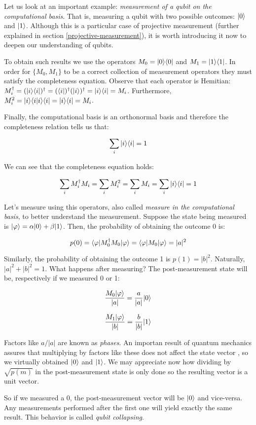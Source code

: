 Let us look at an important example: \emph{measurement of a qubit on the computational basis}. That is, measuring a qubit with two possible outcomes: $|0\rangle$ and $|1\rangle$. Although this is a particular case of projective measurement (further explained in section \ref{projective-measurement}), it is worth introducing it now to deepen our understanding of qubits.

To obtain such results we use the operators $M_0 = |0\rangle \langle 0|$ and $M_1 = |1\rangle \langle 1|$. In order for $\{M_0, M_1\}$ to be a correct collection of measurement operators they must satisfy the completeness equation. Observe that each operator is Hemitian: $M_i^\dagger = (|i\rangle \langle i|)^\dagger = (\langle i|)^\dagger (|i\rangle)^\dagger = |i\rangle \langle i| = M_i$. Furthermore, $M_i^2 = |i\rangle \langle i|i\rangle \langle i| = |i\rangle \langle i| = M_i$.

Finally, the computational basis is an orthonormal basis and therefore the completeness relation tells us that:

$$ \sum_i |i\rangle\langle i| = 1 $$

We can see that the completeness equation holds:

$$ \sum_i M_i^\dagger M_i = \sum_i M_i^2 = \sum_i M_i = \sum_i |i\rangle\langle i| = 1 $$

Let's measure using this operators, also called \emph{measure in the computational basis}, to better understand the measurement. Suppose the state being measured is $|\varphi\rangle = \alpha|0\rangle + \beta|1\rangle$. Then, the probability of obtaining the outcome 0 is:

$$ p(0) = \langle\varphi|M_0^\dagger M_0|\varphi\rangle = \langle\varphi|M_0|\varphi\rangle = |a|^2 $$

Similarly, the probability of obtaining the outcome 1 is $p(1) = |b|^2$. Naturally, $ |a|^2 + |b|^2 = 1$. What happens after measuring? The post-measurement state will be, respectively if we measured 0 or 1:

$$ \frac{M_0|\varphi\rangle}{|a|} = \frac{a}{|a|}|0\rangle$$

$$ \frac{M_1|\varphi\rangle}{|b|} = \frac{b}{|b|}|1\rangle$$

Factors like $a/|a|$ are known as \emph{phases}. An importan result of quantum mechanics assures that multiplying by factors like these does not affect the state vector \cite{Nielsen2002}, so we virtually obtained $|0\rangle$ and $|1\rangle$. We may appreciate now how dividing by $\sqrt{p(m)}$ in the post-measurement state is only done so the resulting vector is a unit vector.

So if we measured a 0, the post-measurement vector will be $|0\rangle$ and vice-versa. Any measurements performed after the first one will yield exactly the same result. This behavior is called \emph{qubit collapsing}.

